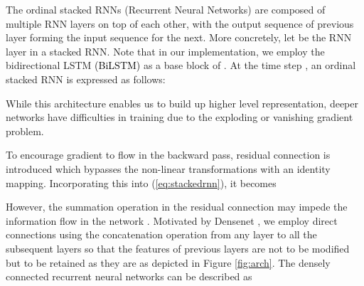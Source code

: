 \documentclass[letterpaper]{article} \usepackage{aaai19}  \usepackage{times}  \usepackage{helvet}  \usepackage{courier}  \usepackage{url}  \usepackage{graphicx}  \frenchspacing  \setlength{\pdfpagewidth}{8.5in}  \setlength{\pdfpageheight}{11in}
\newcommand\sh[1]{\textcolor{black}{#1}}
\begin{document}
\begin{comment}
\subsubsection{Recurrent Networks}
We employ bidirectional LSTM (biLSTM) \cite{Graves06bidirectionallstm} for preserving sequential information of  and . BiLSTM consists of the forward and the backward LSTMs. The forward LSTM reads the input sentence from left to right and the backward LSTM reads the sentence in the reverse order (from right to left). Each LSTM calculates hidden states at each time step   as follows:

Here, the -dimensional vectors , , , , , and  are the input gate, forget gate, output gate, cell state (memory), candidate cell state and hidden state of the LSTM, respectively, at time step . The , , and  are sigmoid, hyper-tangent activation functions and element-wise multiplication, respectively. 
In the first recurrent layer, the -dimensional input vector  is set to  or  for forward LSTM and  or  for backward LSTM, where  is the maximum length of the sentence.
The function  denotes a simple affine transformation in an appropriate dimension. Here we suppress bias terms for readability.
\end{comment}






The ordinal stacked RNNs (Recurrent Neural Networks) are composed of multiple RNN layers on top of each other, with the output sequence of previous layer forming the input sequence for the next. More concretely, let  
be the  
RNN layer in a stacked RNN.
Note that in our implementation, we employ the bidirectional LSTM \sh{(BiLSTM)}
as a base block of . At the time step , an ordinal stacked RNN is expressed as follows:

While this architecture enables us to build up higher level representation, deeper networks have difficulties in training due to the exploding or vanishing gradient problem.

To encourage gradient to flow in the backward pass, residual connection \cite{he2016deep} is introduced which bypasses the non-linear transformations with an identity mapping. Incorporating this into (\ref{eq:stackedrnn}), it becomes



However, the summation operation in the residual connection may impede the information flow in the network \cite{huang2017densely}. Motivated by Densenet \cite{huang2017densely}, we employ direct connections using the concatenation operation from any layer to all the subsequent layers so that the features of previous layers are not to be modified but to be retained as they are as depicted in Figure \ref{fig:arch}.
The densely connected recurrent neural networks can be described as
\end{document}
